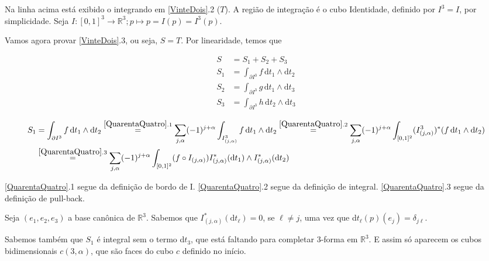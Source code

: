 \documentclass[12pt,a4paper]{article}
\begin{document}
		Na linha acima est\'a exibido o integrando em \ref{VinteDois}.2 ($T$). A regi\~ao de integra\c{c}\~ao \'e o cubo Identidade, definido por $I^3 = I$, por simplicidade. Seja $I : [0,1]^3 \rightarrow \mathbb{R}^3 ; p \mapsto p = I(p) = I^3(p)$.

		\begin{flushright}
		\end{flushright}

		Vamos agora provar \ref{VinteDois}.3, ou seja, $S = T$. Por linearidade, temos que

		\begin{align}
			S &= S_1 + S_2 + S_3 \\
			S_1 &= \int_{\partial I^3} f \,\mathrm{d}t_1 \wedge \mathrm{d}t_2 \\
			S_2 &= \int_{\partial I^3} g \,\mathrm{d}t_1 \wedge \mathrm{d}t_3 \\
			S_3 &= \int_{\partial I^3} h \,\mathrm{d}t_2 \wedge \mathrm{d}t_3
		\end{align}

		\begin{align}
			S_1 &= \int_{\partial I^3} f \,\mathrm{d}t_1 \wedge \mathrm{d}t_2 \stackrel{\ref{QuarentaQuatro}.1}{=} \sum_{j, \alpha} (-1)^{j + \alpha} \int_{I^3_{(j, \alpha)}} f \,\mathrm{d}t_1 \wedge \mathrm{d}t_2 \stackrel{\ref{QuarentaQuatro}.2}{=} \sum_{j, \alpha} (-1)^{j + \alpha} \int_{[0,1]^2} (I_{(j, \alpha)}^{3})^* (f \,\mathrm{d}t_1 \wedge \mathrm{d}t_2) \label{QuarentaQuatro} \\
			&\stackrel{\ref{QuarentaQuatro}.3}{=} \sum_{j, \alpha} (-1)^{j + \alpha} \int_{[0,1]^2} (f \circ I_{(j, \alpha)}) I^*_{(j, \alpha)} (\mathrm{d}t_1) \wedge I^*_{(j, \alpha)} (\mathrm{d}t_2)
		\end{align}

		\ref{QuarentaQuatro}.1 segue da defini\c{c}\~ao de bordo de I. \ref{QuarentaQuatro}.2 segue da defini\c{c}\~ao de integral.	\ref{QuarentaQuatro}.3 segue da defini\c{c}\~ao de pull-back.

		Seja $(e_1, e_2, e_3)$ a base can\^onica de $\mathbb{R}^3$. Sabemos que $I^*_{(j, \alpha)} (\mathrm{d}t_\ell) = 0$, se $\ell \neq j$, uma vez que d$t_\ell(p)(e_j) = \delta_{j\ell}$.

		Sabemos tamb\'em que $S_1$ \'e integral sem o termo d$t_3$, que est\'a faltando para completar 3-forma em $\mathbb{R}^3$. E assim s\'o aparecem os cubos bidimensionais $c(3, \alpha)$, que s\~ao faces do cubo $c$ definido no in\'icio.
\end{document}
